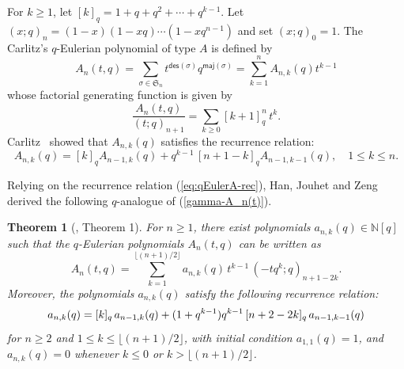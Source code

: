 \documentclass[12pt]{article}
\numberwithin{equation}{section}
\theoremstyle{plain}
\newtheorem{theorem}{Theorem}[section]
\def\des{\mathsf{des}}
\def\maj{\mathsf{maj}}
\begin{document}
	 
	   
	 
	  For $k\geq 1$, let $[k]_q=1+q+q^2+\cdots +q^{k-1}$. Let $(x;q)_n=(1-x)(1-xq)\cdots(1-xq^{n-1})$ and set $(x;q)_0=1$.  
	 The  Carlitz's $q$-Eulerian polynomial of type $A$ \cite{Carlitz} is defined by
	 \begin{equation}\label{eq:qEulerA-def}
	 	A_n(t,q)=\sum_{\sigma\in \mathfrak{S}_n} t^{\des(\sigma)} q^{\maj(\sigma)}
	 	=\sum\limits_{k= 1}^{n}A_{n,k}(q)t^{k-1}
	 \end{equation}
	 whose  factorial generating function is given by 
	  \begin{equation}\label{eq:qEulerA-gf}
	 	\frac{A_n(t,q)}{(t;q)_{n+1}}
	 	=\sum_{k\geq 0} [k+1]_q^n\, t^k.
	 \end{equation}
	   Carlitz~\cite{Carlitz} showed that $A_{n,k}(q)$ satisfies the recurrence relation:
	 \begin{equation}\label{eq:qEulerA-rec}
	 	A_{n,k}(q) = [k]_qA_{n-1,k}(q) + q^{k-1}\,[n+1-k]_q A_{n-1,k-1}(q),\quad 1\le k\le n.
	 \end{equation}
	 
	
	 	
	 Relying on the recurrence relation (\ref{eq:qEulerA-rec}), Han, Jouhet and Zeng \cite{HanJouhetZeng2013qtriangles} derived the following $q$-analogue of (\ref{gamma-A_n(t)}).
	 
	 \begin{theorem}[\cite{HanJouhetZeng2013qtriangles}, Theorem 1]
	 	For $n\geq 1$, there exist polynomials $a_{n,k}(q)\in\mathbb{N}[q]$ such that the $q$-Eulerian polynomials $A_n(t,q)$ can be written as
	 	\begin{equation}\label{eq-Han}
	 		A_n(t,q)=\sum_{k=1}^{\lfloor (n+1)/2\rfloor} a_{n,k}(q)\, t^{k-1}\, (-tq^k;q)_{n+1-2k}.
	 	\end{equation}
	 	Moreover, the polynomials $a_{n,k}(q)$ satisfy the following recurrence relation:
	 	\begin{equation}\label{eq-a_{n,k}(q)}
	 		a_{n,k}(q) = [k]_q\, a_{n-1,k}(q)+ (1+q^{k-1})q^{k-1}\,[n+2-2k]_q\, a_{n-1,k-1}(q)
	 	\end{equation}
	 	for $n\ge 2$ and $1\le k\le \lfloor (n+1)/2\rfloor$, with initial condition $a_{1,1}(q)=1$, and $a_{n,k}(q)=0$ whenever $k\le 0$ or $k>\lfloor (n+1)/2\rfloor$.
	 \end{theorem}
	 
\end{document}
